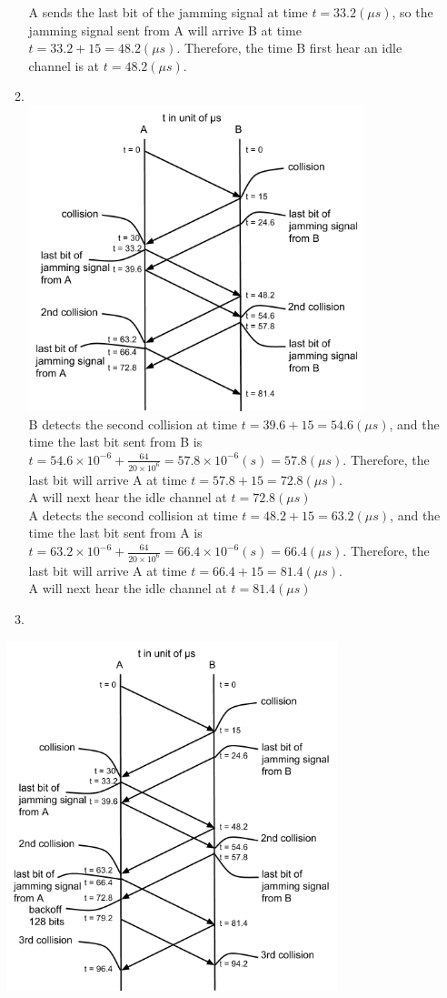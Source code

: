 \documentclass[10pt, a4paper]{article}
\begin{document}
\begin{enumerate}
\begin{enumerate}
        A sends the last bit of the jamming signal at time $t = 33.2 (\mu s)$, so the jamming signal sent from A will arrive B at time $t = 33.2 + 15 = 48.2 (\mu s)$. Therefore, the time B first hear an idle channel is at $t = 48.2 (\mu s)$.
    \item\mbox{}\\
        \includegraphics[height=3.5in]{images/problem_5d}\\
        B detects the second collision at time $t = 39.6 + 15 = 54.6 (\mu s)$, and the time the last bit sent from B is $t = 54.6 \times 10^{-6} + \frac{64}{20 \times 10^6} = 57.8 \times 10^{-6} (s) = 57.8 (\mu s)$. Therefore, the last bit will arrive A at time $t = 57.8 + 15 = 72.8 (\mu s)$.\\
        A will next hear the idle channel at $t = 72.8 (\mu s)$\\
        A detects the second collision at time $t = 48.2 + 15 = 63.2 (\mu s)$, and the time the last bit sent from A is $t = 63.2 \times 10^{-6} + \frac{64}{20 \times 10^6} = 66.4 \times 10^{-6} (s) = 66.4 (\mu s)$. Therefore, the last bit will arrive A at time $t = 66.4 + 15 = 81.4 (\mu s)$.\\
        A will next hear the idle channel at $t = 81.4 (\mu s)$
    \item\mbox{}
    \end{enumerate}
        \includegraphics[height=4in]{images/problem_5e}\\

\end{enumerate}
\end{document}

